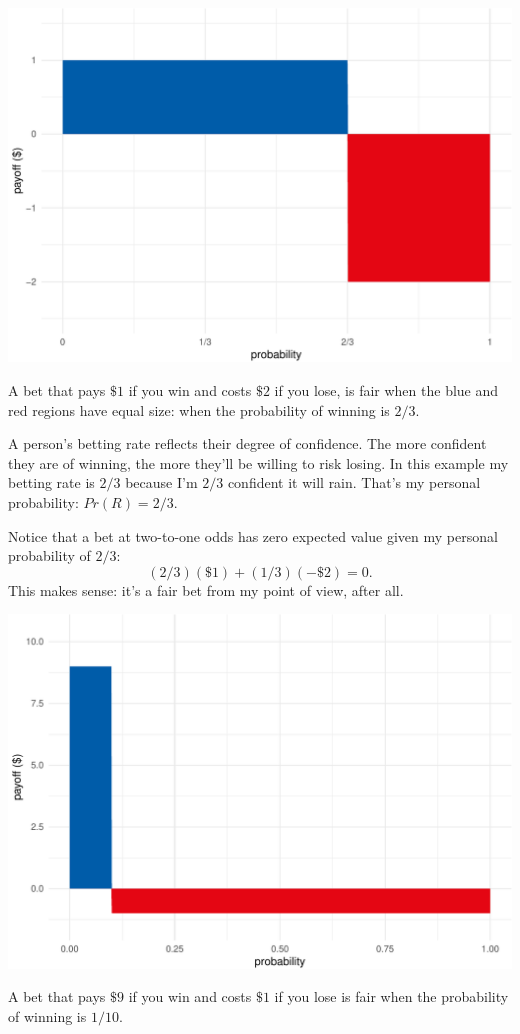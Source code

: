 \documentclass[justified]{tufte-book}
\newcommand{\p}{Pr}
\theoremstyle{definition}
\theoremstyle{definition}
\theoremstyle{definition}
\theoremstyle{remark}
\begin{document}
\begin{marginfigure}
\includegraphics{_main_files/figure-latex/unnamed-chunk-120-1} \caption[A bet that pays $\$1$ if you win and costs $\$2$ if you lose, is fair when the blue and red regions have equal size]{A bet that pays $\$1$ if you win and costs $\$2$ if you lose, is fair when the blue and red regions have equal size: when the probability of winning is $2/3$.}\label{fig:unnamed-chunk-120}
\end{marginfigure}

A person's betting rate reflects their degree of confidence. The more
confident they are of winning, the more they'll be willing to risk
losing. In this example my betting rate is \(2/3\) because I'm \(2/3\)
confident it will rain. That's my personal probability: \(\p(R) = 2/3\).

Notice that a bet at two-to-one odds has zero expected value given my
personal probability of \(2/3\): \[ (2/3)(\$1) + (1/3)(-\$2) = 0. \]
This makes sense: it's a fair bet from my point of view, after all.

\begin{marginfigure}
\includegraphics{_main_files/figure-latex/unnamed-chunk-121-1} \caption[A bet that pays $\$9$ if you win and costs $\$1$ if you lose is fair when the probability of winning is $1/10$]{A bet that pays $\$9$ if you win and costs $\$1$ if you lose is fair when the probability of winning is $1/10$.}\label{fig:unnamed-chunk-121}
\end{marginfigure}
\end{document}
